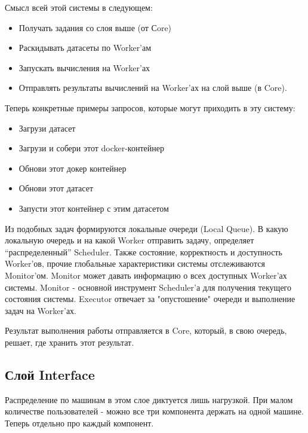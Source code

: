 Смысл всей этой системы в следующем:

\begin{itemize}
	\item Получать задания со слоя выше (от Сore)
	\item Раскидывать датасеты по Worker’ам
	\item Запускать вычисления на Worker’ах
	\item Отправлять результаты вычислений на Worker’ах на слой выше (в Core).
\end{itemize}

Теперь конкретные примеры запросов, которые могут приходить в эту систему:

\begin{itemize}
	\item Загрузи датасет
	\item Загрузи и собери этот docker-контейнер
	\item Обнови этот докер контейнер
	\item Обнови этот датасет
	\item Запусти этот контейнер с этим датасетом
\end{itemize}

Из подобных задач формируются локальные очереди (Local Queue). В какую локальную очередь и на какой Worker отправить задачу, определяет “распределенный” Scheduler. Также состояние, корректность и доступность Worker'ов, прочие глобальные характеристики системы отслеживаются Monitor'ом. Monitor может давать информацию о всех доступных Worker'ах системы. Monitor - основной инструмент Scheduler'а для получения текущего состояния системы. Executor отвечает за "опустошение" очереди и выполнение задач на Worker'ах.

Результат выполнения работы отправляется в Core, который, в свою очередь, решает, где хранить этот результат.

\subsection{Слой Interface}

Распределение по машинам в этом слое диктуется лишь нагрузкой. При малом количестве пользователей - можно все три компонента держать на одной машине. Теперь отдельно про каждый компонент.

